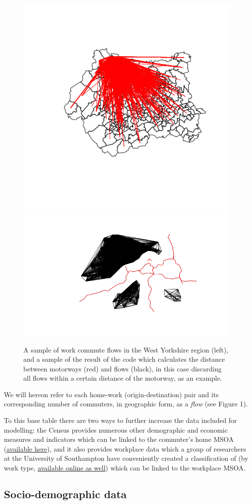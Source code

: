 \documentclass[11pt]{article}
\begin{document}
\begin{figure}
\includegraphics[width=0.49\linewidth]{../figures/flows_500_westyorkshire} \includegraphics[width=0.49\linewidth]{../figures/dist_motorways} \caption{A sample of work commute flows in the West Yorkshire region (left), and a sample of the result of the code which calculates the distance between motorways (red) and flows (black), in this case discarding all flows within a certain distance of the motorway, as an example.}\label{fig:unnamed-chunk-2}
\end{figure}

We will hereon refer to each home-work (origin-destination) pair and its
corresponding number of commuters, in geographic form, as a \emph{flow}
(see Figure 1).

To this base table there are two ways to further increase the data
included for modelling: the Census provides numerous other demographic
and economic measures and indicators which can be linked to the
commuter's home MSOA
(\href{https://www.nomisweb.co.uk/census/2011/data_finder}{available
here}), and it also provides workplace data which a group of researchers
at the University of Southampton have conveniently created a
classification of (by work type,
\href{http://cowz.geodata.soton.ac.uk/download/}{available online as
well}) which can be linked to the workplace MSOA.

\subsection{Socio-demographic data}\label{socio-demographic-data}
\end{document}
